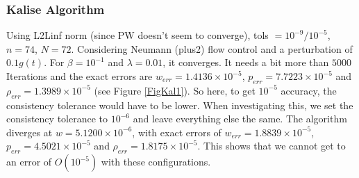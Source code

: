 \documentclass[11pt, a4paper]{article}
\theoremstyle{definition}
\begin{document}
\subsubsection*{Kalise Algorithm}
Using L2Linf norm (since PW doesn't seem to converge), tols $= 10^{-9}/10^{-5}$, $n=74$, $N=72$. Considering Neumann (plus2) flow control and a perturbation of $0.1g(t)$. For $\beta = 10^{-1}$ and $\lambda = 0.01$, it converges. 
It needs a bit more than $5000$ Iterations and the exact errors are $w_{err}= 1.4136 \times 10^{-5}$, $p_{err} = 7.7223 \times 10^{-5}$ and $\rho_{err}= 1.3989 \times 10^{-5}$ (see Figure \ref{FigKal1}). So here, to get $10^{-5}$ accuracy, the consistency tolerance would have to be lower. When investigating this, we set the consistency tolerance to $10^{-6}$ and leave everything else the same. The algorithm diverges at $w=5.1200 \times 10^{-6}$, with exact errors of $w_{err}= 1.8839 \times 10^{-5}$, $p_{err}=4.5021 \times 10^{-5}$ and $\rho_{err}=1.8175 \times 10^{-5}$. This shows that we cannot get to an error of $O(10^{-5})$ with these configurations.\\
\end{document}
